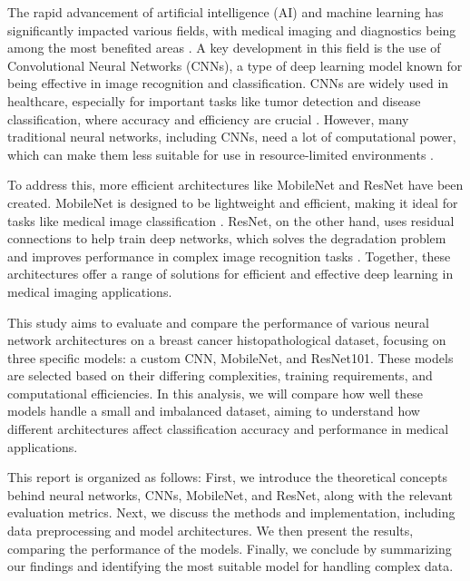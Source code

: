 The rapid advancement of artificial intelligence (AI) and machine learning has significantly impacted various fields, with medical imaging and diagnostics being among the most benefited areas \cite{litjens2017survey}. A key development in this field is the use of Convolutional Neural Networks (CNNs), a type of deep learning model known for being effective in image recognition and classification. CNNs are widely used in healthcare, especially for important tasks like tumor detection and disease classification, where accuracy and efficiency are crucial \cite{9395920}. However, many traditional neural networks, including CNNs, need a lot of computational power, which can make them less suitable for use in resource-limited environments \cite{howard2017mobilenetsefficientconvolutionalneural}. 

To address this, more efficient architectures like MobileNet and ResNet have been created. MobileNet is designed to be lightweight and efficient, making it ideal for tasks like medical image classification \cite{howard2017mobilenetsefficientconvolutionalneural}. ResNet, on the other hand, uses residual connections to help train deep networks, which solves the degradation problem and improves performance in complex image recognition tasks \cite{he2015deepresiduallearningimage}. Together, these architectures offer a range of solutions for efficient and effective deep learning in medical imaging applications.

This study aims to evaluate and compare the performance of various neural network architectures on a breast cancer histopathological dataset, focusing on three specific models: a custom CNN, MobileNet, and ResNet101. These models are selected based on their differing complexities, training requirements, and computational efficiencies. In this analysis, we will compare how well these models handle a small and imbalanced dataset, aiming to understand how different architectures affect classification accuracy and performance in medical applications.

This report is organized as follows: First, we introduce the theoretical concepts behind neural networks, CNNs, MobileNet, and ResNet, along with the relevant evaluation metrics. Next, we discuss the methods and implementation, including data preprocessing and model architectures. We then present the results, comparing the performance of the models. Finally, we conclude by summarizing our findings and identifying the most suitable model for handling complex data.